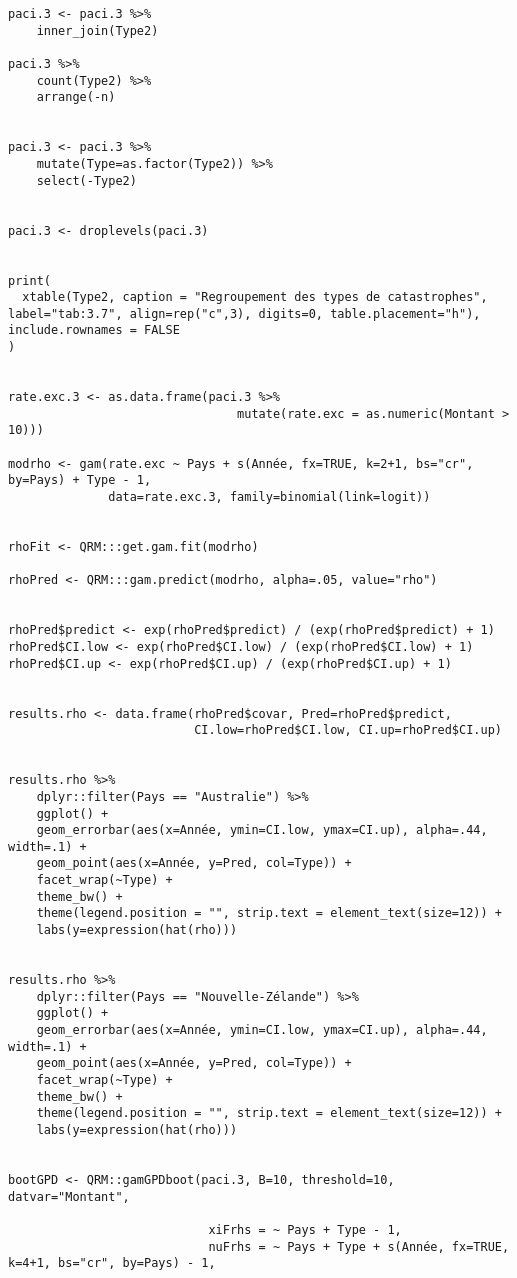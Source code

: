 \begin{lstlisting}
paci.3 <- paci.3 %>% 
    inner_join(Type2)

paci.3 %>% 
    count(Type2) %>% 
    arrange(-n)


paci.3 <- paci.3 %>% 
    mutate(Type=as.factor(Type2)) %>% 
    select(-Type2)


paci.3 <- droplevels(paci.3)


print(
  xtable(Type2, caption = "Regroupement des types de catastrophes", label="tab:3.7", align=rep("c",3), digits=0, table.placement="h"), include.rownames = FALSE
)


rate.exc.3 <- as.data.frame(paci.3 %>% 
                                mutate(rate.exc = as.numeric(Montant > 10)))

modrho <- gam(rate.exc ~ Pays + s(Année, fx=TRUE, k=2+1, bs="cr", by=Pays) + Type - 1, 
              data=rate.exc.3, family=binomial(link=logit))


rhoFit <- QRM:::get.gam.fit(modrho)   

rhoPred <- QRM:::gam.predict(modrho, alpha=.05, value="rho")


rhoPred$predict <- exp(rhoPred$predict) / (exp(rhoPred$predict) + 1)
rhoPred$CI.low <- exp(rhoPred$CI.low) / (exp(rhoPred$CI.low) + 1)
rhoPred$CI.up <- exp(rhoPred$CI.up) / (exp(rhoPred$CI.up) + 1)


results.rho <- data.frame(rhoPred$covar, Pred=rhoPred$predict,
                          CI.low=rhoPred$CI.low, CI.up=rhoPred$CI.up)


results.rho %>% 
    dplyr::filter(Pays == "Australie") %>% 
    ggplot() + 
    geom_errorbar(aes(x=Année, ymin=CI.low, ymax=CI.up), alpha=.44, width=.1) +
    geom_point(aes(x=Année, y=Pred, col=Type)) + 
    facet_wrap(~Type) + 
    theme_bw() + 
    theme(legend.position = "", strip.text = element_text(size=12)) + 
    labs(y=expression(hat(rho)))


results.rho %>% 
    dplyr::filter(Pays == "Nouvelle-Zélande") %>% 
    ggplot() + 
    geom_errorbar(aes(x=Année, ymin=CI.low, ymax=CI.up), alpha=.44, width=.1) +
    geom_point(aes(x=Année, y=Pred, col=Type)) + 
    facet_wrap(~Type) + 
    theme_bw() + 
    theme(legend.position = "", strip.text = element_text(size=12)) + 
    labs(y=expression(hat(rho)))
    

bootGPD <- QRM::gamGPDboot(paci.3, B=10, threshold=10, datvar="Montant",
                            
                            xiFrhs = ~ Pays + Type - 1,  
                            nuFrhs = ~ Pays + Type + s(Année, fx=TRUE, k=4+1, bs="cr", by=Pays) - 1, 
                            

\end{lstlisting}
